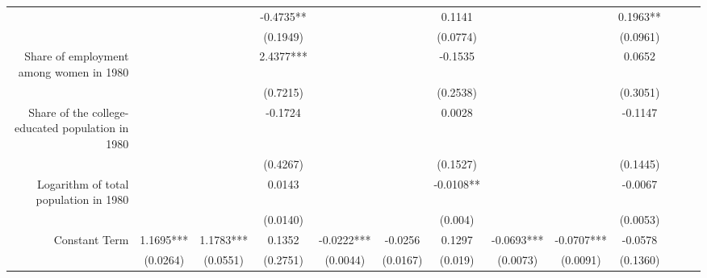 \begin{frame}
\begin{table}[ht]
{\begin{tabular}{rcccccccccccc}
                &                &                & -0.4735**      &                &                & 0.1141         &                 &                & 0.1963**       \\
                &                &                & \small(0.1949) &                &                & \small(0.0774) &                 &                & \small(0.0961) \\

Share of employment among women in 1980                      

                &                &                & 2.4377***      &                &                & -0.1535        &                 &                & 0.0652         \\
                &                &                & \small(0.7215) &                &                & \small(0.2538) &                 &                & \small(0.3051) \\

Share of the college-educated population in 1980             

                &                &                & -0.1724        &                &                & 0.0028         &                 &                & -0.1147        \\
                &                &                & \small(0.4267) &                &                & \small(0.1527) &                 &                & \small(0.1445) \\

Logarithm of total population in 1980                        

                &                &                & 0.0143         &                &                & -0.0108**     &                  &                & -0.0067        \\
                &                &                & \small(0.0140) &                &                & \small(0.004) &                  &                & \small(0.0053) \\

Constant Term

                & 1.1695***      & 1.1783***      & 0.1352         & -0.0222***     & -0.0256        & 0.1297        & -0.0693***       & -0.0707***     & -0.0578        \\
                & \small(0.0264) & \small(0.0551) & \small(0.2751) & \small(0.0044) & \small(0.0167) & \small(0.019) & \small(0.0073)   & \small(0.0091) & \small(0.1360) \\


\end{tabular}}
\end{table}
\end{frame}
